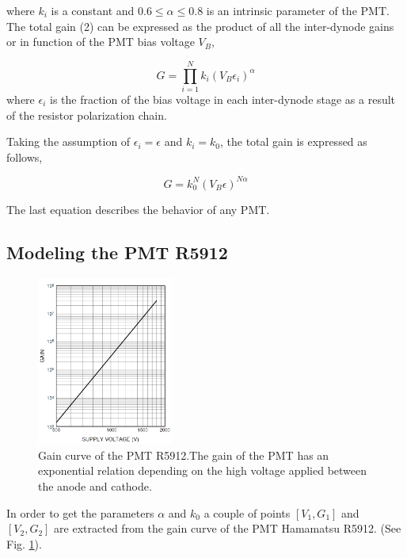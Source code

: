 \documentclass[letterpaper, 10 pt, conference]{ieeeconf}  %
\begin{document}
where $k_i$ is a constant and $ 0.6  \leq \alpha \leq 0.8$ is an intrinsic parameter of the PMT. The total gain (2) can be expressed as the product of all the inter-dynode gains or in function of the PMT bias voltage $V_B$,

\begin{equation}
G =  \prod_{i=1}^{N}  k_i (V_B \epsilon_i)^{\alpha} 
\end{equation}
where $\epsilon_i$ is the fraction of the bias voltage in each inter-dynode stage as a result of the resistor polarization chain.

Taking the assumption of $\epsilon_i = \epsilon$ and $k_i=k_0$, the total gain is expressed as follows,

\begin{equation}
G = k_0^N (V_B \epsilon)^{N\alpha} 
\end{equation}

The last equation describes the behavior of any PMT.

\subsection{Modeling the PMT R5912}


\begin{figure}[h!]
\begin{center}
\includegraphics[width=0.4\textwidth]{Figures/Gain_curve}
\caption{Gain curve of the PMT R5912.The gain of the PMT has an exponential relation depending on the high voltage applied between the anode and cathode.}
\label{Gain_curve}
\end{center}
\end{figure}

In order to get the parameters $\alpha$ and $k_0$ a couple of points $[V_1, G_1]$ and $[V_2, G_2]$ are extracted from the gain curve of the PMT Hamamatsu R5912. (See Fig. \ref{Gain_curve}).
\end{document}
